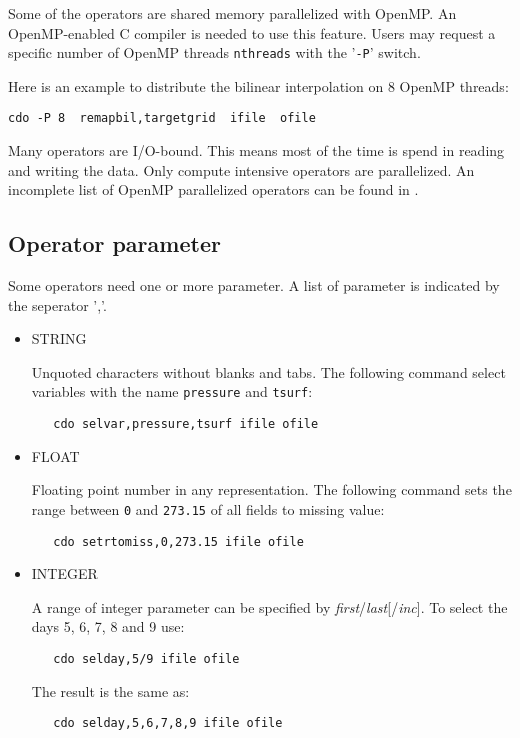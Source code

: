 Some of the {\CDO} operators are shared memory parallelized with OpenMP.
An OpenMP-enabled C compiler is needed to use this feature.
Users may request a specific number of OpenMP threads {\tt nthreads} with the '{\tt -P}' switch.

Here is an example to distribute the bilinear interpolation on 8 OpenMP threads:
\begin{lstlisting}[frame=single, backgroundcolor=\color{pcolor2}, basicstyle=\ttfamily, columns=flexible]
   cdo -P 8  remapbil,targetgrid  ifile  ofile
\end{lstlisting}

Many {\CDO} operators are I/O-bound. This means most of the time is spend in reading and writing the data. 
Only compute intensive {\CDO} operators are parallelized. 
An incomplete list of OpenMP parallelized operators can be found in .

\subsection{Operator parameter}

Some operators need one or more parameter. A list of parameter is indicated by the seperator ','.

\begin{itemize}
\item STRING

Unquoted characters without blanks and tabs.
The following command select variables with the name {\tt pressure} and {\tt tsurf}:
\begin{verbatim}
   cdo selvar,pressure,tsurf ifile ofile
\end{verbatim}

\item FLOAT

Floating point number in any representation.
The following command sets the range between {\tt 0} and {\tt 273.15}
of all fields to missing value:
\begin{verbatim}
   cdo setrtomiss,0,273.15 ifile ofile
\end{verbatim}

\item INTEGER

A range of integer parameter can be specified by {\it first}/{\it last}[/{\it inc}].
To select the days 5, 6, 7, 8 and 9 use:
\begin{verbatim}
   cdo selday,5/9 ifile ofile
\end{verbatim}
The result is the same as:
\begin{verbatim}
   cdo selday,5,6,7,8,9 ifile ofile
\end{verbatim}
\end{itemize}
